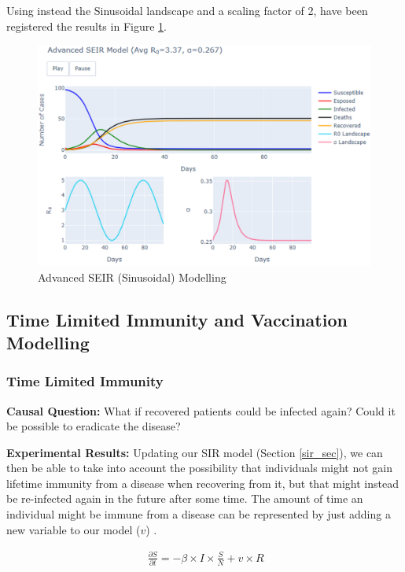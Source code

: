 Using instead the Sinusoidal landscape and a scaling factor of 2, have been registered the results in Figure \ref{sine_seir}.

\begin{figure}[ht!]%
    \centering
    \includegraphics[width=1\linewidth]{latex/images/sine_seir.pdf}
    \caption{Advanced SEIR (Sinusoidal) Modelling}
    \vspace{-0.5cm}
    \label{sine_seir}
\end{figure}

\subsection{Time Limited Immunity and Vaccination Modelling}
\vspace{-0.1cm}
\subsubsection{Time Limited Immunity}
\textbf{Causal Question:} What if recovered patients could be infected again? Could it be possible to eradicate the disease?

\textbf{Experimental Results:} Updating our SIR model (Section \ref{sir_sec}), we can then be able to take into account the possibility that individuals might not gain lifetime immunity from a disease when recovering from it, but that might instead be re-infected again in the future after some time. The amount of time an individual might be immune from a disease can be represented by just adding a new variable to our model ($v$) \cite{immune}.

\useshortskip
\begin{align}
\ \frac{\partial S}{\partial t} = -\beta \times I \times \frac{S}{N} + v \times R
\end{align}
\useshortskip


